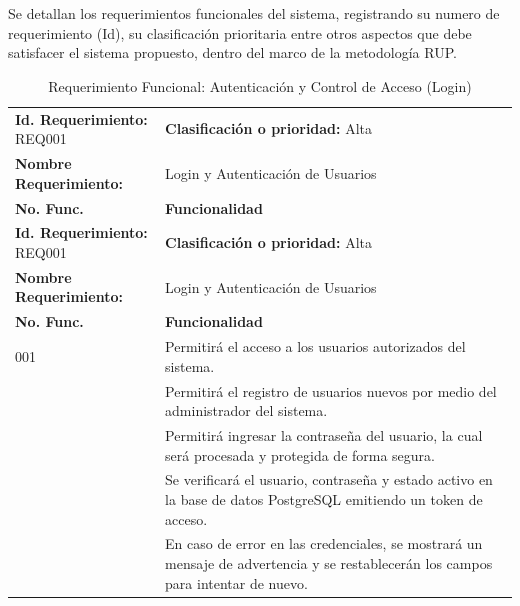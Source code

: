 Se detallan los requerimientos funcionales del sistema, registrando su numero de requerimiento  (Id), su clasificación prioritaria entre otros aspectos que debe satisfacer el sistema propuesto, dentro del marco de la metodología RUP.

{
\small
{}
\setlength{\parindent}{0pt}
\begin{xltabular}{\linewidth}{
    >{\raggedright\arraybackslash}p{4.2cm} 
    >{\raggedright\arraybackslash}X
}

    \caption{Requerimiento Funcional: Autenticación y Control de Acceso (Login)} \label{tab:req001} \\
    \toprule
    \textbf{Id. Requerimiento:} REQ001 & \textbf{Clasificación o prioridad:} Alta \\
    \textbf{Nombre Requerimiento:} & Login y Autenticación de Usuarios \\
    \textbf{No. Func.} & \textbf{Funcionalidad} \\
    \midrule
    \endfirsthead

    \toprule
    \textbf{Id. Requerimiento:} REQ001 & \textbf{Clasificación o prioridad:} Alta \\
    \textbf{Nombre Requerimiento:} & Login y Autenticación de Usuarios \\
    \textbf{No. Func.} & \textbf{Funcionalidad} \\
    \midrule
    \endhead

    \endfoot

    \bottomrule
\endlastfoot

    001 & Permitirá el acceso a los usuarios autorizados del sistema. \\
     & Permitirá el registro de usuarios nuevos por medio del administrador del sistema. \\
     & Permitirá ingresar la contraseña del usuario, la cual será procesada y protegida de forma segura. \\
     & Se verificará el usuario, contraseña y estado activo en la base de datos PostgreSQL emitiendo un token de acceso. \\
     & En caso de error en las credenciales, se mostrará un mensaje de advertencia y se restablecerán los campos para intentar de nuevo. \\
\end{xltabular}
}

